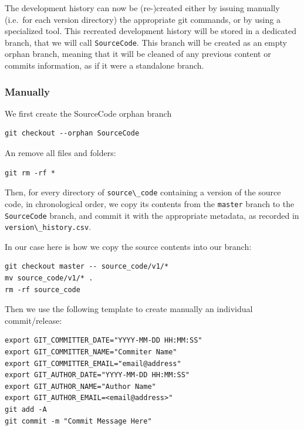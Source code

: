 \documentclass[]{article}
\newcommand{\passthrough}[1]{#1}
\begin{document}
The development history can now be (re-)created either by issuing
manually (i.e.~for each version directory) the appropriate git commands,
or by using a specialized tool. This recreated development history will
be stored in a dedicated branch, that we will call
\passthrough{\lstinline!SourceCode!}. This branch will be created as an
empty orphan branch, meaning that it will be cleaned of any previous
content or commits information, as if it were a standalone branch.

\hypertarget{manually}{%
\subsubsection{Manually}\label{manually}}

We first create the SourceCode orphan branch

\begin{lstlisting}
git checkout --orphan SourceCode
\end{lstlisting}

An remove all files and folders:

\begin{lstlisting}
git rm -rf *
\end{lstlisting}

Then, for every directory of \passthrough{\lstinline!source\_code!}
containing a version of the source code, in chronological order, we copy
its contents from the \passthrough{\lstinline!master!} branch to the
\passthrough{\lstinline!SourceCode!} branch, and commit it with the
appropriate metadata, as recorded in
\passthrough{\lstinline!version\_history.csv!}.

In our case here is how we copy the source contents into our branch:

\begin{lstlisting}
git checkout master -- source_code/v1/*
mv source_code/v1/* .
rm -rf source_code
\end{lstlisting}

Then we use the following template to create manually an individual
commit/release:

\begin{lstlisting}
export GIT_COMMITTER_DATE="YYYY-MM-DD HH:MM:SS"
export GIT_COMMITTER_NAME="Commiter Name"
export GIT_COMMITTER_EMAIL="email@address"
export GIT_AUTHOR_DATE="YYYY-MM-DD HH:MM:SS"
export GIT_AUTHOR_NAME="Author Name"
export GIT_AUTHOR_EMAIL=<email@address>"
git add -A
git commit -m "Commit Message Here"
\end{lstlisting}
\end{document}
